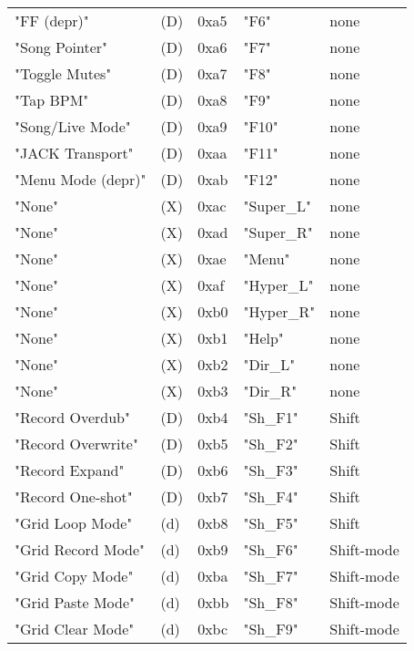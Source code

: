 \begin{table}[htb]
\begin{tabular}{l l l l l}
        "FF (depr)"          & (D)  &  0xa5   & "F6"         & none \\
        "Song Pointer"       & (D)  &  0xa6   & "F7"         & none \\
        "Toggle Mutes"       & (D)  &  0xa7   & "F8"         & none \\
        "Tap BPM"            & (D)  &  0xa8   & "F9"         & none \\
        "Song/Live Mode"     & (D)  &  0xa9   & "F10"        & none \\
        "JACK Transport"     & (D)  &  0xaa   & "F11"        & none \\
        "Menu Mode (depr)"   & (D)  &  0xab   & "F12"        & none \\
        "None"               & (X)  &  0xac   & "Super\_L"   &  none \\
        "None"               & (X)  &  0xad   & "Super\_R"   &  none \\
        "None"               & (X)  &  0xae   & "Menu"       & none \\
        "None"               & (X)  &  0xaf   & "Hyper\_L"   &  none \\
        "None"               & (X)  &  0xb0   & "Hyper\_R"   &  none \\
        "None"               & (X)  &  0xb1   & "Help"       & none \\
        "None"               & (X)  &  0xb2   & "Dir\_L"     &  none \\
        "None"               & (X)  &  0xb3   & "Dir\_R"     &  none \\
        "Record Overdub"     & (D)  &  0xb4   & "Sh\_F1"     &  Shift \\
        "Record Overwrite"   & (D)  &  0xb5   & "Sh\_F2"     &  Shift \\
        "Record Expand"      & (D)  &  0xb6   & "Sh\_F3"     &  Shift \\
        "Record One-shot"    & (D)  &  0xb7   & "Sh\_F4"     &  Shift \\
        "Grid Loop Mode"     & (d)  &  0xb8   & "Sh\_F5"     &  Shift \\
        "Grid Record Mode"   & (d)  &  0xb9   & "Sh\_F6"     &  Shift-mode \\
        "Grid Copy Mode"     & (d)  &  0xba   & "Sh\_F7"     &  Shift-mode \\
        "Grid Paste Mode"    & (d)  &  0xbb   & "Sh\_F8"     &  Shift-mode \\
        "Grid Clear Mode"    & (d)  &  0xbc   & "Sh\_F9"     &  Shift-mode \\

\end{tabular}
\end{table}
